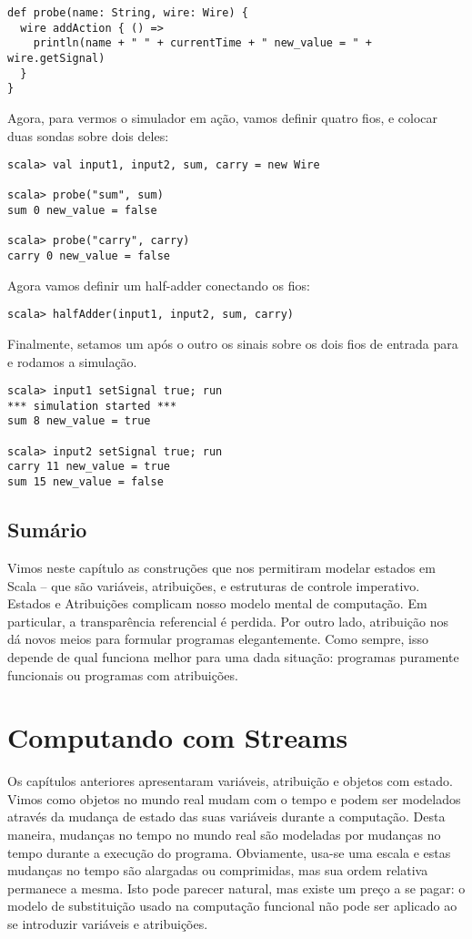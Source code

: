 \begin{lstlisting}
def probe(name: String, wire: Wire) {
  wire addAction { () =>
    println(name + " " + currentTime + " new_value = " + wire.getSignal)
  }
}
\end{lstlisting}
Agora, para vermos o simulador em ação, vamos definir quatro fios, e
colocar duas sondas sobre dois deles: 
\begin{lstlisting}
scala> val input1, input2, sum, carry = new Wire

scala> probe("sum", sum)
sum 0 new_value = false

scala> probe("carry", carry)
carry 0 new_value = false
\end{lstlisting}
Agora vamos definir um half-adder conectando os fios:
\begin{lstlisting}
scala> halfAdder(input1, input2, sum, carry)
\end{lstlisting}
Finalmente, setamos um após o outro os sinais sobre os dois fios de
entrada para  e rodamos a simulação.
\begin{lstlisting}
scala> input1 setSignal true; run
*** simulation started ***
sum 8 new_value = true

scala> input2 setSignal true; run
carry 11 new_value = true
sum 15 new_value = false
\end{lstlisting}

\section{Sumário}

Vimos neste capítulo as construções que nos permitiram modelar estados
em Scala -- que são variáveis, atribuições, e estruturas de controle
imperativo. Estados e Atribuições complicam nosso modelo mental de
computação. Em particular, a transparência referencial é perdida. Por
outro lado, atribuição nos dá novos meios para formular programas
elegantemente. Como sempre, isso depende de qual funciona melhor para
uma dada situação: programas puramente funcionais ou programas com
atribuições.

\chapter{Computando com Streams}

Os capítulos anteriores apresentaram variáveis, atribuição e objetos com estado.
Vimos como objetos no mundo real mudam com o tempo e podem ser modelados através da
mudança de estado das suas variáveis durante a computação. Desta maneira, mudanças no 
tempo no mundo real  são modeladas por mudanças no tempo durante a execução do programa.
Obviamente, usa-se uma escala e estas mudanças no tempo são alargadas ou comprimidas, mas
sua ordem relativa permanece a mesma. Isto pode parecer natural, mas existe um preço a se
pagar: o modelo de substituição usado na computação funcional não pode ser aplicado ao se
introduzir variáveis e atribuições.

